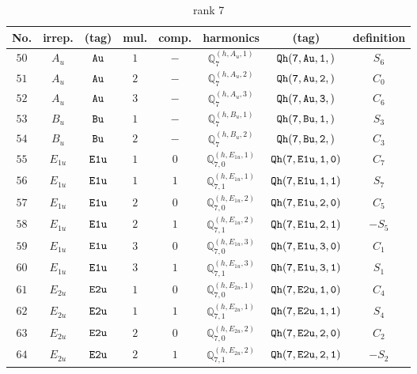 \documentclass[fleqn,8pt]{jsarticle}
\begin{document}
\begin{table}[ht!]
\begin{center}
\caption{rank 7}
\renewcommand{\arraystretch}{1.3}
\begin{tabular}{cccccccc} \hline \hline
No. & irrep. & (tag) & mul. & comp. & harmonics & (tag) & definition \\ \hline
$ 50 $ & $ A_{u} $ & $ {\tt Au} $ & $ 1 $ & $ - $ & $ \mathbb{Q}_{7}^{(h,A_{u},1)} $ & $ {\tt Qh(7,Au,1,)} $ & $ S_{6} $ \\
$ 51 $ & $ A_{u} $ & $ {\tt Au} $ & $ 2 $ & $ - $ & $ \mathbb{Q}_{7}^{(h,A_{u},2)} $ & $ {\tt Qh(7,Au,2,)} $ & $ C_{0} $ \\
$ 52 $ & $ A_{u} $ & $ {\tt Au} $ & $ 3 $ & $ - $ & $ \mathbb{Q}_{7}^{(h,A_{u},3)} $ & $ {\tt Qh(7,Au,3,)} $ & $ C_{6} $ \\
$ 53 $ & $ B_{u} $ & $ {\tt Bu} $ & $ 1 $ & $ - $ & $ \mathbb{Q}_{7}^{(h,B_{u},1)} $ & $ {\tt Qh(7,Bu,1,)} $ & $ S_{3} $ \\
$ 54 $ & $ B_{u} $ & $ {\tt Bu} $ & $ 2 $ & $ - $ & $ \mathbb{Q}_{7}^{(h,B_{u},2)} $ & $ {\tt Qh(7,Bu,2,)} $ & $ C_{3} $ \\
$ 55 $ & $ E_{1u} $ & $ {\tt E1u} $ & $ 1 $ & $ 0 $ & $ \mathbb{Q}_{7,0}^{(h,E_{1u},1)} $ & $ {\tt Qh(7,E1u,1,0)} $ & $ C_{7} $ \\
$ 56 $ & $ E_{1u} $ & $ {\tt E1u} $ & $ 1 $ & $ 1 $ & $ \mathbb{Q}_{7,1}^{(h,E_{1u},1)} $ & $ {\tt Qh(7,E1u,1,1)} $ & $ S_{7} $ \\
$ 57 $ & $ E_{1u} $ & $ {\tt E1u} $ & $ 2 $ & $ 0 $ & $ \mathbb{Q}_{7,0}^{(h,E_{1u},2)} $ & $ {\tt Qh(7,E1u,2,0)} $ & $ C_{5} $ \\
$ 58 $ & $ E_{1u} $ & $ {\tt E1u} $ & $ 2 $ & $ 1 $ & $ \mathbb{Q}_{7,1}^{(h,E_{1u},2)} $ & $ {\tt Qh(7,E1u,2,1)} $ & $ - S_{5} $ \\
$ 59 $ & $ E_{1u} $ & $ {\tt E1u} $ & $ 3 $ & $ 0 $ & $ \mathbb{Q}_{7,0}^{(h,E_{1u},3)} $ & $ {\tt Qh(7,E1u,3,0)} $ & $ C_{1} $ \\
$ 60 $ & $ E_{1u} $ & $ {\tt E1u} $ & $ 3 $ & $ 1 $ & $ \mathbb{Q}_{7,1}^{(h,E_{1u},3)} $ & $ {\tt Qh(7,E1u,3,1)} $ & $ S_{1} $ \\
$ 61 $ & $ E_{2u} $ & $ {\tt E2u} $ & $ 1 $ & $ 0 $ & $ \mathbb{Q}_{7,0}^{(h,E_{2u},1)} $ & $ {\tt Qh(7,E2u,1,0)} $ & $ C_{4} $ \\
$ 62 $ & $ E_{2u} $ & $ {\tt E2u} $ & $ 1 $ & $ 1 $ & $ \mathbb{Q}_{7,1}^{(h,E_{2u},1)} $ & $ {\tt Qh(7,E2u,1,1)} $ & $ S_{4} $ \\
$ 63 $ & $ E_{2u} $ & $ {\tt E2u} $ & $ 2 $ & $ 0 $ & $ \mathbb{Q}_{7,0}^{(h,E_{2u},2)} $ & $ {\tt Qh(7,E2u,2,0)} $ & $ C_{2} $ \\
$ 64 $ & $ E_{2u} $ & $ {\tt E2u} $ & $ 2 $ & $ 1 $ & $ \mathbb{Q}_{7,1}^{(h,E_{2u},2)} $ & $ {\tt Qh(7,E2u,2,1)} $ & $ - S_{2} $ \\
 \hline \hline
\end{tabular}
\end{center}
\end{table}
\end{document}
